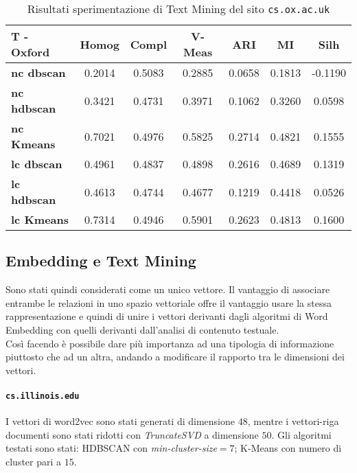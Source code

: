 \begin{table}[H]
	\begin{tabular}{| l | c | c | c | c | c | c |}
	\hline
	\textbf{T - Oxford}  & \textbf{Homog} & \textbf{Compl} & \textbf{V-Meas}  & \textbf{ARI}  & \textbf{MI}  & \textbf{Silh} \\ [3ex] \hline
	\textbf{nc dbscan} & 0.2014 & 0.5083 & 0.2885 & 0.0658 & 0.1813 & -0.1190 \\ [3ex]
	 \hline 
	\textbf{nc hdbscan} & 0.3421 & 0.4731 & 0.3971 & 0.1062 & 0.3260 & 0.0598 \\ [3ex]
	 \hline
	\textbf{nc Kmeans} & 0.7021 & 0.4976 & 0.5825 & 0.2714 & 0.4821 & 0.1555 \\ [3ex]
	 \hline	
	\textbf{lc dbscan} & 0.4961 & 0.4837 & 0.4898 & 0.2616 & 0.4689 & 0.1319 \\ [3ex]
	\hline
	\textbf{lc hdbscan} & 0.4613 & 0.4744 & 0.4677 & 0.1219 & 0.4418 & 0.0526 \\ [3ex]
	\hline
	\textbf{lc Kmeans} & 0.7314 & 0.4946 & 0.5901 & 0.2623 & 0.4813 & 0.1600 \\ [3ex]
	\hline
	\end{tabular}
	\caption{Risultati sperimentazione di Text Mining del sito \texttt{cs.ox.ac.uk}}
	\label{metricheTextOx}
\end{table}



\subsection{Embedding e Text Mining}
Sono stati quindi considerati come un unico vettore. Il vantaggio di associare entrambe le relazioni in uno spazio vettoriale offre il vantaggio usare la stessa rappresentazione e quindi di unire i vettori derivanti dagli algoritmi di Word Embedding con quelli derivanti dall'analisi di contenuto testuale. 
\\
Così facendo è possibile dare più importanza ad una tipologia di informazione piuttosto che ad un altra, andando a modificare il rapporto tra le dimensioni dei vettori.


\paragraph{\texttt{cs.illinois.edu}} I vettori di word2vec sono stati generati di dimensione $48$, mentre i vettori-riga documenti sono stati ridotti con \textit{TruncateSVD} a dimensione $50$. Gli algoritmi testati sono stati: HDBSCAN con \textit{min-cluster-size}$=7$; K-Means con numero di cluster pari a $15$. 


